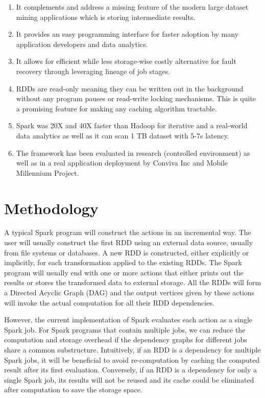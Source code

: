 \documentclass[conference]{sig-alternate-05-2015}
\begin{document}
\begin{enumerate}
\item It complements and address a missing feature of the modern large dataset mining applications which is storing intermediate results.
\item It provides an easy programming interface for faster adoption by many application developers and data analytics.
\item It allows for efficient while less storage-wise costly alternative for fault recovery through leveraging lineage of job stages.
\item RDDs are read-only meaning they can be written out in the background without any program pauses or read-write locking mechanisms. This is quite a promising feature for making any caching algorithm tractable.
\item Spark was 20X and 40X faster than Hadoop for iterative and a real-world data analytics as well as it can scan 1 TB dataset with 5-7s latency.
\item The framework has been evaluated in research (controlled environment) as well as in a real application deployment by Conviva Inc and Mobile Millennium Project.
\end{enumerate}
	
\section{Methodology}

A typical Spark program will construct the actions in an incremental way. The user will usually construct the first RDD using an external data source, usually from file systems or databases. A new RDD is constructed, either explicitly or implicitly, for each transformation applied to the existing RDDs. The Spark program will usually end with one or more actions that either prints out the results or stores the transformed data to external storage. All the RDDs will form a Directed Acyclic Graph (DAG) and the output vertices given by these actions will invoke the actual computation for all their RDD dependencies.

However, the current implementation of Spark evaluates each action as a single Spark job. For Spark programs that contain multiple jobs, we can reduce the computation and storage overhead if the dependency graphs for different jobs share a common substructure. Intuitively, if an RDD is a dependency for multiple Spark jobs, it will be beneficial to avoid re-computation by caching the computed result after its first evaluation. Conversely, if an RDD is a dependency for only a single Spark job, its results will not be reused and its cache could be eliminated after computation to save the storage space.
\end{document}
